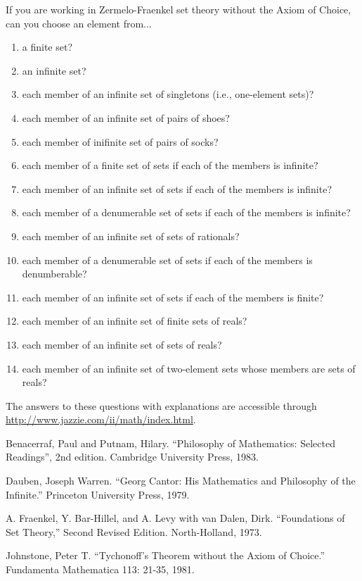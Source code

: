 \smallskip

If you are working in Zermelo-Fraenkel set theory without the Axiom of
Choice, can you choose an element from...
\begin{enumerate}
\item  a finite set?
 \item an infinite set?
 \item each member of an infinite set of singletons (i.e., one-element sets)?
 \item each member of an infinite set of pairs of shoes?
 \item each member of inifinite set of pairs of socks?
 \item each member of a finite set of sets if each of the members is infinite?
 \item each member of an infinite set of sets if each of the members is infinite?
 \item each member of a denumerable set of sets if each of the members is infinite?
 \item each member of an infinite set of sets of rationals?
\item each member of a denumerable set of sets if each of the members is
    denumberable?
\item each member of an infinite set of sets if each of the members is finite?
\item each member of an infinite set of finite sets of reals?
\item each member of an infinite set of sets of reals?
\item each member of an infinite set of two-element sets whose members are
    sets of reals?
\end{enumerate}
The answers to these questions with explanations are accessible through
\url{http://www.jazzie.com/ii/math/index.html}.


\Ref

Benacerraf, Paul and Putnam, Hilary.  ``Philosophy of Mathematics: Selected
Readings'', 2nd edition. Cambridge University Press, 1983.

Dauben, Joseph Warren.  ``Georg Cantor: His Mathematics and Philosophy of the
Infinite.''  Princeton University Press, 1979.

A. Fraenkel, Y.  Bar-Hillel, and A. Levy with van Dalen, Dirk. ``Foundations
of Set Theory,'' Second Revised Edition. North-Holland, 1973.

Johnstone, Peter T.  ``Tychonoff's Theorem without the Axiom of Choice.''
Fundamenta Mathematica 113: 21-35, 1981.

